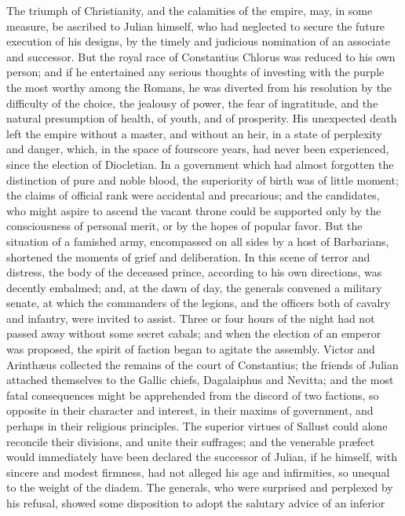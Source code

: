 The triumph of Christianity, and the calamities of the empire,
may, in some measure, be ascribed to Julian himself, who had
neglected to secure the future execution of his designs, by the
timely and judicious nomination of an associate and successor.
But the royal race of Constantius Chlorus was reduced to his own
person; and if he entertained any serious thoughts of investing
with the purple the most worthy among the Romans, he was diverted
from his resolution by the difficulty of the choice, the jealousy
of power, the fear of ingratitude, and the natural presumption of
health, of youth, and of prosperity. His unexpected death left
the empire without a master, and without an heir, in a state of
perplexity and danger, which, in the space of fourscore years,
had never been experienced, since the election of Diocletian. In
a government which had almost forgotten the distinction of pure
and noble blood, the superiority of birth was of little moment;
the claims of official rank were accidental and precarious; and
the candidates, who might aspire to ascend the vacant throne
could be supported only by the consciousness of personal merit,
or by the hopes of popular favor. But the situation of a famished
army, encompassed on all sides by a host of Barbarians, shortened
the moments of grief and deliberation. In this scene of terror
and distress, the body of the deceased prince, according to his
own directions, was decently embalmed; and, at the dawn of day,
the generals convened a military senate, at which the commanders
of the legions, and the officers both of cavalry and infantry,
were invited to assist. Three or four hours of the night had not
passed away without some secret cabals; and when the election of
an emperor was proposed, the spirit of faction began to agitate
the assembly. Victor and Arinthæus collected the remains of the
court of Constantius; the friends of Julian attached themselves
to the Gallic chiefs, Dagalaiphus and Nevitta; and the most fatal
consequences might be apprehended from the discord of two
factions, so opposite in their character and interest, in their
maxims of government, and perhaps in their religious principles.
The superior virtues of Sallust could alone reconcile their
divisions, and unite their suffrages; and the venerable præfect
would immediately have been declared the successor of Julian, if
he himself, with sincere and modest firmness, had not alleged his
age and infirmities, so unequal to the weight of the diadem. The
generals, who were surprised and perplexed by his refusal, showed
some disposition to adopt the salutary advice of an inferior
